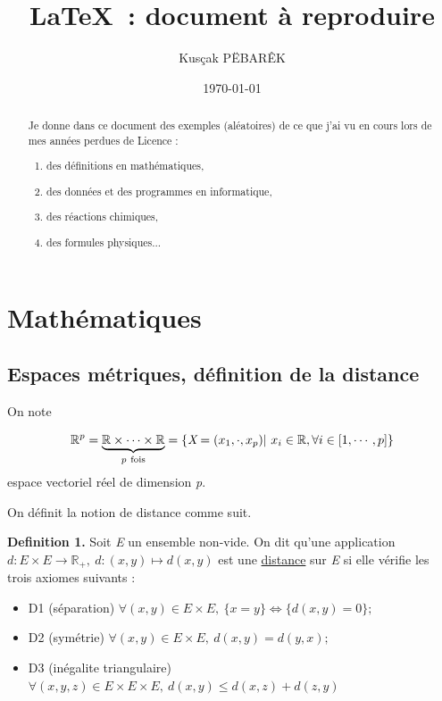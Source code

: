 \documentclass[a4paper, 12pt]{article}
\title{\LaTeX ~: document à reproduire}
\author{Kusçak PËBARÊK}
\date{\today}
\begin{document}
\maketitle

    \begin{abstract}
    Je donne dans ce document des exemples (al\'eatoires) de ce que j'ai vu en cours lors de mes ann\'ees perdues de Licence :

    
    \begin{enumerate}
        \item des d\'efinitions en math\'ematiques,
        \item des donn\'ees et des programmes en informatique,
        \item des r\'eactions chimiques,
        \item des formules physiques...
        
    \end{enumerate}
\end{abstract}
    \newpage

    \tableofcontents

    \newpage
    \section{Math\'ematiques}
    \subsection{Espaces métriques, définition de la distance}
    
    
    On note
    
    $$ \mathbb{R}^{p}=\underbrace{\mathbb{R}\times\cdots\times\mathbb{R}}_{p ~\text{fois}}=\{\emph{X}=(x_1,\cdot,x_p)|~ x_i\in\mathbb{R},\forall{i}\in [1,\cdots ,p]\} $$
    espace vectoriel r\'eel de dimension \emph{p}.
     
     On définit la notion de distance comme suit.
     
     \textbf{Definition 1.} Soit \emph{E} un ensemble non-vide. On dit qu'une application $d: E\times E \to\mathbb{R}_+,~ d:(x,y)\mapsto d(x,y)$ est une \underline{distance} sur \emph{E} si elle vérifie les trois axiomes suivants :
     
     \begin{itemize}
        \item D1 (s\'eparation) $\forall{(x,y)} \in E \times E, ~\{ x = y\} \Leftrightarrow \{d(x,y) = 0 \}; $
        \item D2 (sym\'etrie) $\forall{(x,y)} \in E \times E,~d(x,y) = d(y,x);$
        \item D3 (in\'egalite triangulaire) $\forall{(x,y,z)} \in E \times E \times E,~d(x,y) \leq d(x,z) + d(z,y)$
    \end{itemize}
     
\end{document}
